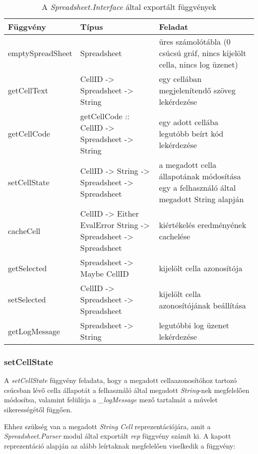 \begin{table}
	\centering
	\begin{tabularx}{\textwidth}{ |l|X|X|}
		\hline
		Függvény & Típus & Feladat \\
		\hline\hline
		emptySpreadSheet & Spreadsheet & üres számolótábla (0 csúcsú gráf, nincs kijelölt cella, nincs log üzenet) \\
		\hline
		getCellText & CellID -> Spreadsheet -> String & egy cellában megjelenítendő szöveg lekérdezése \\
		\hline
		getCellCode & getCellCode :: CellID -> Spreadsheet -> String & egy adott cellába legutóbb beírt kód lekérdezése \\
		\hline
		setCellState & CellID -> String -> Spreadsheet -> Spreadsheet & a megadott cella állapotának módosítása egy a felhasználó által megadott String alapján \\
		\hline
		cacheCell & CellID -> Either EvalError String -> Spreadsheet -> Spreadsheet & kiértékelés eredményének cachelése \\
		\hline
		getSelected & Spreadsheet -> Maybe CellID & kijelölt cella azonosítója \\
		\hline
		setSelected & CellID -> Spreadsheet -> Spreadsheet & kijelölt cella azonosítójának beállítása \\
		\hline 
		getLogMessage & Spreadsheet -> String & legutóbbi log üzenet lekérdezése \\
		\hline
	\end{tabularx}
	\caption[A \textit{Spreadsheet.Interface} által exportált függvények]{A \textit{Spreadsheet.Interface} által exportált függvények}
	\label{tab:interface}
\end{table}

\subsubsection{setCellState}

A \textit{setCellState} függvény feladata, hogy a megadott cellaazonosítóhoz tartozó csúcsban lévő cella állapotát a felhasználó által megadott \textit{String}-nek megfelelően módosítsa, valamint felülírja a \textit{\_logMessage} mező tartalmát a múvelet sikerességétől függően.

Ehhez szükség van a megadott \textit{String} \textit{Cell} reprezentációjára, amit a \textit{Spreadsheet.Parser} modul által exportált \textit{rep} függvény számít ki. A kapott reprezentáció alapján az alább leírtaknak megfelelően viselkedik a függvény:

